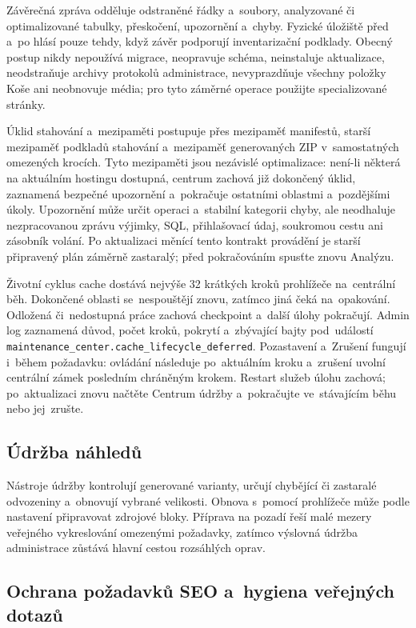 \documentclass[11pt,a4paper]{article}
\newcommand{\codeword}[1]{\nolinkurl{#1}}
\begin{document}
Závěrečná zpráva odděluje odstraněné řádky a~soubory, analyzované či
optimalizované tabulky, přeskočení, upozornění a~chyby. Fyzické úložiště před
a~po hlásí pouze tehdy, když závěr podporují inventarizační podklady. Obecný
postup nikdy nepoužívá migrace, neopravuje schéma, neinstaluje aktualizace,
neodstraňuje archivy protokolů administrace, nevyprazdňuje všechny položky Koše
ani neobnovuje média; pro tyto záměrné operace použijte specializované stránky.

Úklid stahování a~mezipaměti postupuje přes mezipaměť manifestů, starší
mezipaměť podkladů stahování a~mezipaměť generovaných ZIP v~samostatných
omezených krocích. Tyto mezipaměti jsou nezávislé optimalizace: není-li některá
na aktuálním hostingu dostupná, centrum zachová již dokončený úklid, zaznamená
bezpečné upozornění a~pokračuje ostatními oblastmi a~pozdějšími úkoly.
Upozornění může určit operaci a~stabilní kategorii chyby, ale neodhaluje
nezpracovanou zprávu výjimky, SQL, přihlašovací údaj, soukromou cestu ani
zásobník volání. Po aktualizaci měnící tento kontrakt provádění je starší
připravený plán záměrně zastaralý; před pokračováním spusťte znovu Analýzu.

Životní cyklus cache dostává nejvýše 32 krátkých kroků prohlížeče na~centrální
běh. Dokončené oblasti se~nespouštějí znovu, zatímco jiná čeká na~opakování.
Odložená či~nedostupná práce zachová checkpoint a~další úlohy pokračují.
Admin log zaznamená důvod, počet kroků, pokrytí a~zbývající bajty pod~událostí
\codeword{maintenance\_center.cache\_lifecycle\_deferred}.
Pozastavení a~Zrušení fungují i~během požadavku: ovládání následuje po~aktuálním
kroku a~zrušení uvolní centrální zámek posledním chráněným krokem.
Restart služeb úlohu zachová; po~aktualizaci znovu načtěte Centrum údržby
a~pokračujte ve~stávajícím běhu nebo jej~zrušte.

\subsection{Údržba náhledů}

Nástroje údržby kontrolují generované varianty, určují chybějící či zastaralé
odvozeniny a~obnovují vybrané velikosti. Obnova s~pomocí prohlížeče může podle
nastavení připravovat zdrojové bloky. Příprava na pozadí řeší malé mezery
veřejného vykreslování omezenými požadavky, zatímco výslovná údržba administrace
zůstává hlavní cestou rozsáhlých oprav.

\subsection{Ochrana požadavků SEO a~hygiena veřejných dotazů}
\end{document}
